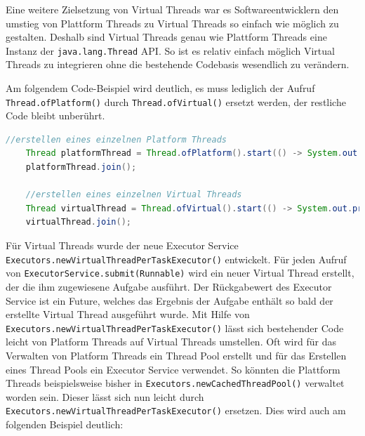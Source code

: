 \documentclass[fontsize=12pt,paper=a4,twoside=semi,parskip=half-,headsepline,headinclude]{scrreprt}
\newcommand{\code}[1]{\texttt{#1}}
\begin{document}
Eine weitere Zielsetzung von Virtual Threads war es Softwareentwicklern den umstieg von Plattform Threads zu Virtual Threads so einfach wie möglich zu gestalten. Deshalb sind Virtual Threads genau wie Plattform Threads eine Instanz der \code{java.lang.Thread} API. So ist es relativ einfach möglich Virtual Threads zu integrieren ohne die bestehende Codebasis wesendlich zu verändern.

Am folgendem Code-Beispiel wird deutlich, es muss lediglich der Aufruf \code{Thread.ofPlatform()} durch \code{Thread.ofVirtual()} ersetzt werden, der restliche Code bleibt unberührt.

\begin{lstlisting}[language=Java]
	//erstellen eines einzelnen Platform Threads
	Thread platformThread = Thread.ofPlatform().start(() -> System.out.println("Platform Thread"));
	platformThread.join();

	//erstellen eines einzelnen Virtual Threads
	Thread virtualThread = Thread.ofVirtual().start(() -> System.out.println("Virtual Thread"));
	virtualThread.join();
\end{lstlisting}

Für Virtual Threads wurde der neue Executor Service \code{Executors.newVirtualThreadPerTaskExecutor()} entwickelt. Für jeden Aufruf von \code{ExecutorService.submit(Runnable)} wird ein neuer Virtual Thread erstellt, der die ihm zugewiesene Aufgabe ausführt. Der Rückgabewert des Executor Service ist ein Future, welches das Ergebnis der Aufgabe enthält so bald der erstellte Virtual Thread ausgeführt wurde. Mit Hilfe von \code{Executors.newVirtualThreadPerTaskExecutor()} lässt sich bestehender Code leicht von Platform Threads auf Virtual Threads umstellen. Oft wird für das Verwalten von Platform Threads ein Thread Pool erstellt und für das Erstellen eines Thread Pools ein Executor Service verwendet. So könnten die Plattform Threads beispielsweise bisher in \code{Executors.newCachedThreadPool()} verwaltet worden sein. Dieser lässt sich nun leicht durch \code{Executors.newVirtualThreadPerTaskExecutor()} ersetzen. Dies wird auch am folgenden Beispiel deutlich:
\end{document}
